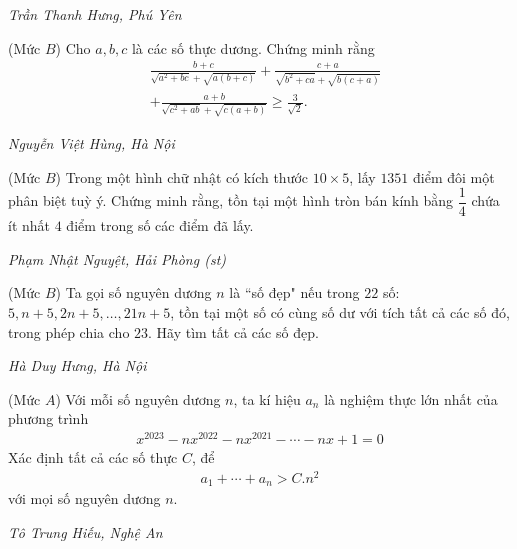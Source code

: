 \begin{multicols}{2}
\begin{figure}[H]
		\vspace*{-10pt}
	\end{figure}
	\begin{flushright}
		\textit{Trần Thanh Hưng, Phú Yên}
	\end{flushright}
	{}
	(Mức $B$) Cho $a, b, c$ là các số thực dương. Chứng minh rằng
	\begin{align*}
		&\frac{b+c}{\sqrt{\!a^2\!+\!b c}\!+\!\!\sqrt{\!a(b+c)}}\!+\!\frac{c\!+\!a}{\sqrt{\!b^2\!+\!c a}\!+\!\!\sqrt{\!b(c\!+\!a)}}\\
		&+\frac{a+b}{\sqrt{c^2+a b}+\sqrt{c(a+b)}} \geq \frac{3}{\sqrt{2}} .
	\end{align*}
	\begin{flushright}
		\textit{Nguyễn Việt Hùng, Hà Nội}
	\end{flushright}
	{}
	(Mức $B$) Trong một hình chữ nhật có kích thước $10\times 5$, lấy $1351$ điểm đôi một phân biệt tuỳ ý. Chứng minh rằng, tồn tại một hình tròn bán kính bằng $\dfrac14$ chứa ít nhất $4$ điểm trong số các điểm đã lấy.
	\begin{flushright}
		\textit{Phạm Nhật Nguyệt, Hải Phòng (st)}
	\end{flushright}
	{}
	(Mức $B$) Ta gọi số nguyên dương $n$ là ``số đẹp" nếu trong $22$ số: $5,n+5,2n+5,\ldots,21n+5$, tồn tại một số có cùng số dư với tích tất cả các số đó, trong phép chia cho $23$. Hãy tìm tất cả các số đẹp.
	\begin{flushright}
		\textit{Hà Duy Hưng, Hà Nội}
	\end{flushright}
	{}
	(Mức $A$) Với mỗi số nguyên dương $n$, ta kí hiệu $a_n$ là nghiệm thực lớn nhất của phương trình
	\begin{align*}
		x^{2023}-nx^{2022}-nx^{2021}-\cdots-nx+1=0
	\end{align*}
	Xác định tất cả các số thực $C$, để 
	\begin{align*}
		a_1+\cdots+a_n>C. n^2
	\end{align*}
	với mọi số nguyên dương $n$.
	\begin{flushright}
		\textit{Tô Trung Hiếu, Nghệ An}
	\end{flushright}
	{}

\end{multicols}
